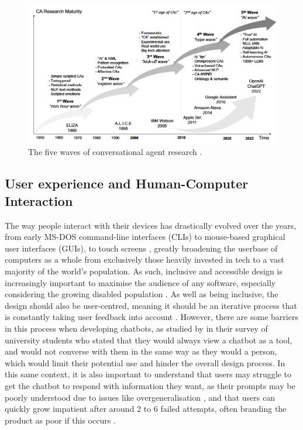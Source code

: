 \documentclass[12pt]{report}
\begin{document}
    \begin{figure}[H] 
        \centering
        \includegraphics[width=.8\linewidth]{ChatbotWaves.png}
        \caption{The five waves of conversational agent research \autocite{schobel_charting_2024}.}
        \label{fig:ChatbotWaves}
    \end{figure}

    

    \subsection{User experience and Human-Computer Interaction}
    The way people interact with their devices has drastically evolved over the years, from early MS-DOS command-line 
    interfaces (CLIs) to mouse-based graphical user interfaces (GUIs), to touch screens \autocite{kotian_systematic_2024}, greatly broadening
    the userbase of computers as a whole from exclusively those heavily invested in tech to a vast majority of the world's 
    population. As such, inclusive and accessible design is increasingly important to maximise the audience of any software,
    especially considering the growing disabled population \autocite{putnam_how_2012}. As well as being inclusive, the design 
    should also be user-centred, meaning it should be an iterative process that is constantly taking user feedback 
    into account \autocite{chammas_closer_2015}. However, there are some barriers in this process when developing 
    chatbots, as studied by \textcite{clark_what_2019} in their survey of university students who stated that they would 
    always view a chatbot as a tool, and would not converse with them in the same way as they would a person, which would 
    limit their potential use and hinder the overall design process. 
    In this same context, it is also important to understand that users may struggle
    to get the chatbot to respond with information they want, as their prompts may be poorly understood
    due to issues like overgeneralisation \autocite{zamfirescu-pereira_why_2023}, and that users can quickly 
    grow impatient after around 2 to 6 failed attempts, often branding the product as poor if this occurs \autocite{luger_like_2016}.
\end{document}
